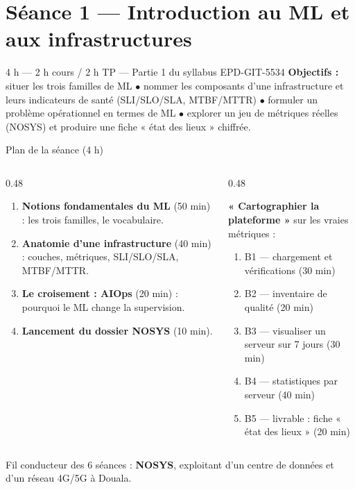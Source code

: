 \section{Séance 1 --- Introduction au ML et aux infrastructures}
{4 h --- 2 h cours / 2 h TP --- Partie 1 du syllabus EPD-GIT-5534}
{\textbf{Objectifs :} situer les trois familles de ML $\bullet$ nommer les composants d'une
infrastructure et leurs indicateurs de santé (SLI/SLO/SLA, MTBF/MTTR) $\bullet$
formuler un problème opérationnel en termes de ML $\bullet$ explorer un jeu de
métriques réelles (NOSYS) et produire une fiche « état des lieux » chiffrée.}

\begin{frame}{Plan de la séance (4 h)}
\begin{columns}[t]
\begin{column}{0.48\textwidth}
\begin{kbox}
\begin{enumerate}
\item \textbf{Notions fondamentales du ML} (50 min) : les trois familles, le vocabulaire.
\item \textbf{Anatomie d'une infrastructure} (40 min) : couches, métriques, SLI/SLO/SLA, MTBF/MTTR.
\item \textbf{Le croisement : AIOps} (20 min) : pourquoi le ML change la supervision.
\item \textbf{Lancement du dossier NOSYS} (10 min).
\end{enumerate}
\end{kbox}
\end{column}
\begin{column}{0.48\textwidth}
\begin{ebox}
\textbf{« Cartographier la plateforme »} sur les vraies métriques
 :
\begin{enumerate}
\item B1 --- chargement et vérifications (30 min)
\item B2 --- inventaire de qualité (20 min)
\item B3 --- visualiser un serveur sur 7 jours (30 min)
\item B4 --- statistiques par serveur (40 min)
\item B5 --- livrable : fiche « état des lieux » (20 min)
\end{enumerate}
\end{ebox}
\end{column}
\end{columns}
\vspace{1mm}
\begin{center}\small
Fil conducteur des 6 séances : \textbf{NOSYS}, exploitant d'un centre de données
et d'un réseau 4G/5G à Douala.
\end{center}
\end{frame}

